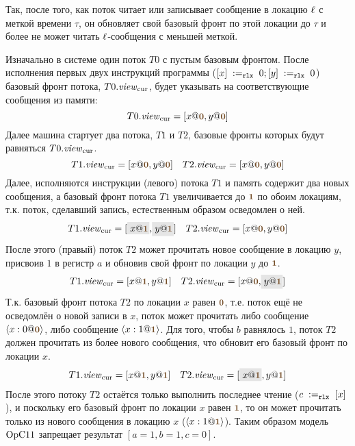 Так, после того, как поток читает или записывает сообщение в локацию $\ell$ с меткой времени $\tau$, он обновляет
свой базовый фронт по этой локации до $\tau$ и более не может читать $\ell$-сообщения с меньшей меткой.

Изначально в системе один поток $T0$ с пустым базовым фронтом.
После исполнения первых двух инструкций программы
($[x] \;:=_{\mathtt{rlx}}\;0; [y] \;:=_{\mathtt{rlx}}\;0$) базовый фронт потока, $T0.\mathit{view}_{\mathrm{cur}}$, будет указывать на
соответствующие сообщения из памяти:
\[
T0.\Rcur = [x@\tstamp{0}, y@\tstamp{0}]
\]
Далее машина стартует два потока, $T1$ и $T2$, базовые фронты которых будут равняться $T0.\mathit{view}_{\mathrm{cur}}$.
\[
T1.\Rcur = [x@\tstamp{0}, y@\tstamp{0}] \quad T2.\Rcur = [x@\tstamp{0}, y@\tstamp{0}]
\]
Далее, исполняются инструкции (левого) потока $T1$ и память содержит два новых сообщения,
а базовый фронт потока $T1$ увеличивается до $\tstamp{1}$ по обоим локациям,
т.к. поток, сделавший запись, естественным образом осведомлен о ней.
\[
\begin{array}{l}
T1.\Rcur = [\graybox{x@\tstamp{1}}, \graybox{y@\tstamp{1}}] \quad T2.\Rcur = [x@\tstamp{0}, y@\tstamp{0}]
\end{array}
\]
После этого (правый) поток $T2$ может прочитать новое сообщение в локацию $y$, присвоив $1$ в регистр $a$
и обновив свой фронт по локации $y$ до $\tstamp{1}$.
\[
\begin{array}{l}
T1.\Rcur = [x@\tstamp{1}, y@\tstamp{1}] \quad T2.\Rcur = [x@\tstamp{0}, \graybox{y@\tstamp{1}}]
\end{array}
\]
Т.к. базовый фронт потока $T2$ по локации $x$ равен $\tstamp{0}$, т.е. поток ещё не осведомлён о новой записи в $x$,
поток может прочитать либо сообщение $\angled{x:0@\tstamp{0}}$, либо сообщение $\angled{x:1@\tstamp{1}}$.
Для того, чтобы $b$ равнялось $1$, поток $T2$ должен прочитать из более нового сообщения, что обновит его
базовый фронт по локации $x$.
\[
\begin{array}{l}
T1.\Rcur = [x@\tstamp{1}, y@\tstamp{1}] \quad T2.\Rcur = [\graybox{x@\tstamp{1}}, y@\tstamp{1}]
\end{array}
\]
После этого потоку $T2$ остаётся только выполнить последнее чтение ($c \;:=_{\mathtt{rlx}}\;[x]$),
и поскольку его базовый фронт по локации $x$ равен $\tstamp{1}$, то он может прочитать только
из нового сообщения в локацию $x$ ($\angled{x:1@\tstamp{1}}$).
Таким образом модель $\mathrm{OpC11}$ запрещает результат $[a = 1, b = 1, c = 0]$.


